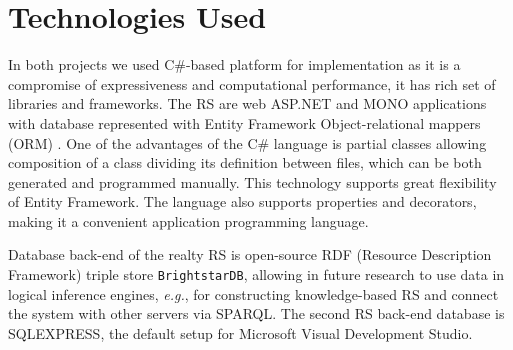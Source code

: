 \documentclass[conference,a4]{IEEEtran}
\begin{document}




\section{Technologies Used}
\label{sec:tech}

In both projects we used C\#-based platform \cite{ben16} for implementation as it is a compromise of expressiveness and computational performance, it has rich set of libraries and frameworks.  The RS are web ASP.NET and MONO applications with database represented with Entity Framework Object-relational mappers (ORM) \cite{ef15}.  One of the advantages of the C\# language is partial classes allowing composition of a class dividing its definition between files, which can be both generated and programmed manually.  This technology supports great flexibility of Entity Framework.  The language also supports properties and decorators, making it a convenient application programming language.

Database back-end of the realty RS is open-source RDF (Resource Description Framework) triple store \texttt{BrightstarDB}, allowing in future research to use data in logical inference engines, \emph{e.g.}, for constructing knowledge-based RS and connect the system with other servers via SPARQL.  The second RS back-end database is SQLEXPRESS, the default setup for Microsoft Visual Development Studio.
\end{document}
